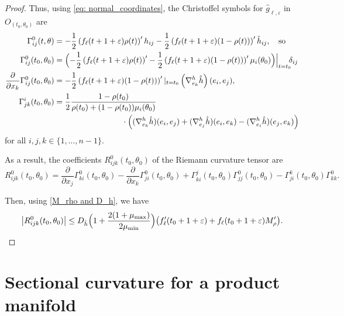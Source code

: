 \documentclass[JEP,XML,SOM,Unicode,NoFloatCountersInSection]{cedram}
\theoremstyle{definition}
\let\eps\varepsilon
\renewcommand{\>}{{\rangle}}
\newcommand{\<}{{\langle}}
\begin{document}
\begin{proof}
Thus, using \eqref{eq: normal_coordinates}, the Christoffel symbols for $\hat g_{\ell,\eps}$ in $O_{(t_0,\theta_0)}$ are\vspace*{-3pt}
\begin{align*}
\Gamma^0_{ij}(t,\theta) &=-\frac{1}{2}\left(f_\ell(t+1+\eps)\rho(t)\right)'h_{ij}-\frac{1}{2}\left(f_\ell(t+1+\eps)(1-\rho(t))\right)'\hat h_{ij}, \quad\text{so}\\
\Gamma^0_{ij}(t_0,\theta_0) &= \Bigl(-\frac{1}{2}\left(f_\ell(t+1+\eps)\rho(t)\right)'-\frac{1}{2}\left(f_\ell(t+1+\eps)(1-\rho(t))\right)'\mu_i(\theta_0)\Bigr)\Big|_{t=t_0}\!\!\delta_{ij}
\\
\frac{\partial}{\partial x_k}\Gamma^0_{ij}(t_0,\theta_0) &= -\frac{1}{2}\left(f_\ell(t+1+\eps)(1-\rho(t))\right)'|_{t=t_0}\left(\nabla^h_{e_k} \hat h\right)(e_i,e_j),
\\
\Gamma^i_{jk}(t_0,\theta_0)&=\frac{1}{2}\frac{1-\rho(t_0)}{\rho(t_0)+(1-\rho(t_0))\mu_i(\theta_0)}\\
&\hspace*{3cm}{}\cdot\left((\nabla^h_{e_k}\hat h)(e_i,e_j)+(\nabla^h_{e_j}\hat h)(e_i,e_k)-(\nabla^h_{e_i}\hat h)(e_j,e_k)\right)
\end{align*}
for all $i,j,k\in\{1,\ldots, n-1\}$.

As a result, the coefficients $R^0_{ijk}(t_0,\theta_0)$ of the Riemann curvature tensor are\vspace*{-3pt}
\begin{equation*}
R^0_{ijk}(t_0,\theta_0) =\frac{\partial}{\partial x_j}\Gamma^0_{ki}(t_0,\theta_0)-\frac{\partial}{\partial x_k}\Gamma^0_{ji}(t_0,\theta_0)+\Gamma^j_{ki}(t_0,\theta_0)\Gamma^0_{jj}(t_0,\theta_0)-\Gamma^k_{ji}(t_0,\theta_0)\Gamma^0_{kk}.
\end{equation*}

Then, using \eqref{M_rho and D_h}, we have\vspace*{-3pt}
\[
\left|R^0_{ijk}(t_0,\theta_0)\right|\leq D_{\hat h}\Bigl(1+\frac{2(1+\mu_{\max})}{2\mu_{\min}}\Bigr)\bigl(f'_\ell(t_0+1+\eps)+f_\ell(t_0+1+\eps)M'_\rho\bigr).\qedhere
\]
\end{proof}

\section{Sectional curvature for a product manifold}
\end{document}
